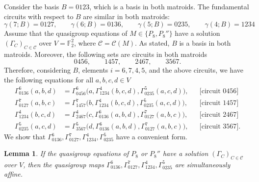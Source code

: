\documentclass[preprint,12pt]{elsarticle}
\newtheorem{lemma}[theorem]{Lemma}
\theoremstyle{definition}
\newcommand{\F}{\mathbb F}
\newcommand{\circuittag}[1]{\text{[circuit $#1$]}}
\begin{document}
Consider the basis $B = 0123$, which is a basis in both matroids. 
The fundamental circuits with respect to $B$ are similar in both matroids:
\[
 \gamma(7;B)=0127,\qquad \gamma(6;B)=0136,\qquad
 \gamma(5;B)=0235,\qquad \gamma(4;B)=1234
\]
Assume that the quasigroup equations of $M \in \{P_8,P_8''\}$ have a solution
$(\Gamma_C)_{C \in \mathcal{C}}$ over $V=\F_2^2$, where
$\mathcal C=\mathcal C(M)$. As stated, $B$ is a basis in both matroids. 
Moreover, the following sets are circuits in both matroids
\begin{equation}\label{eq:faces}
	0456,\qquad1457,\qquad2467,\qquad3567.
\end{equation}
Therefore, considering $B$, elements $i=6,7,4,5$, and the above circuits, we have the following equations for all $a,b,c,d \in V$
\begin{align}
	\Gamma_{0136}^6(a,b,d)&=\Gamma_{0456}^6\bigl(a,\Gamma_{1234}^4(b,c,d),\Gamma_{0235}^5(a,c,d)\bigr), &&\circuittag{0456}\label{eq:cubeeq12}\\
	\Gamma_{0127}^7(a,b,c)&=\Gamma_{1457}^7\bigl(b,\Gamma_{1234}^4(b,c,d),\Gamma_{0235}^5(a,c,d)\bigr), &&\circuittag{1457}\label{eq:cubeeq22}\\
	\Gamma_{1234}^4(b,c,d)&=\Gamma_{2467}^4\bigl(c,\Gamma_{0136}^6(a,b,d),\Gamma_{0127}^7(a,b,c)\bigr), &&\circuittag{2467}\label{eq:cubeeq32}\\
	\Gamma_{0235}^5(a,c,d)&=\Gamma_{3567}^5\bigl(d,\Gamma_{0136}^6(a,b,d),\Gamma_{0127}^7(a,b,c)\bigr), &&\circuittag{3567}.\label{eq:cubeeq42}
\end{align}
We show that $\Gamma_{0136}^6, \Gamma_{0127}^7, \Gamma_{1234}^4, \Gamma_{0235}^5$ have a convenient form.

\begin{lemma}\label{thm:cube}
If the quasigroup equations of $P_8$ or $P_8''$ have a solution
$(\Gamma_C)_{C\in\mathcal C}$ over $V$, then the quasigroup maps 
$\Gamma_{0136}^6, \Gamma_{0127}^7, \Gamma_{1234}^4, \Gamma_{0235}^5$
are simultaneously affine.
\end{lemma}
\end{document}
